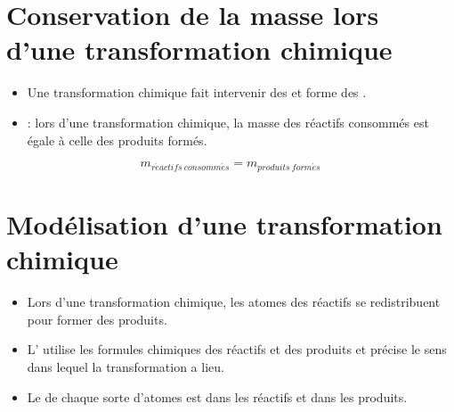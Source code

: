 \documentclass[12pt,a4paper]{article}
\date{}
\title{}
\begin{document}
	
	


%

\section{{\small Conservation de la masse lors d'une transformation chimique}}

%	
\begin{mybilan}
	\begin{itemize}
		\item Une transformation chimique fait intervenir des  et forme des .
		\item {} : lors d'une transformation chimique, la masse des réactifs consommés est égale à celle des produits formés. 
	\end{itemize}
	
	\vspace*{-2cm}
	
	\begin{LARGE}
		\begin{center}
		\begin{equation*}
		m_{r\acute{e}actifs \: consomm\acute{e}s} = m_{produits \: form\acute{e}s} 
		\end{equation*}
	\end{center}
	\end{LARGE}
	
	
\end{mybilan}


\section{Modélisation d'une transformation chimique}


\begin{mybilan}
	\begin{itemize}
		\item Lors d'une transformation chimique, les atomes des réactifs se redistribuent pour former des produits.
		\item L' utilise les formules chimiques des réactifs et des produits et précise le sens dans lequel la transformation a lieu.
		\item Le  de chaque sorte d'atomes est  dans les réactifs et dans les produits. 
	\end{itemize}
\end{mybilan}
\end{document}
